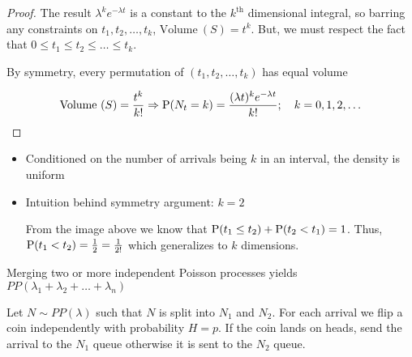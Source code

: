 \begin{theorem}
\begin{proof}
    The result $\lambda^k e^{-\lambda t}$ is a constant to the
    $k^{\text{th}}$ dimensional integral, so barring any constraints on
    $t_1,t_2,\ldots,t_k$, $\textrm{Volume}\ (S) = t^k$. But, we must
    respect the fact that $0 \le t_1 \le t_2 \le \ldots \le t_k$.

    By symmetry, every permutation of $(t_1,t_2,\ldots,t_k)$ has
    equal volume

    \begin{displaymath}
      \textrm{Volume}\ (S) = \frac{t^k}{k!} \Rightarrow \operatorname{\mathrm{P}}(N_t = k)
      = \frac{(\lambda t)^k e^{-\lambda t}}{k!}; \quad k=0,1,2,\ldots
    \end{displaymath}

  \end{proof}

  \begin{itemize}
    \item Conditioned on the number of arrivals being $k$ in an
      interval, the density is uniform
    \item Intuition behind symmetry argument: $k=2$
      \begin{center}
      \end{center}
      From the image above we know that
      $\operatorname{\mathrm{P}}(t_1 \le t_2) + \operatorname{\mathrm{P}}(t_2 < t_1) = 1$. Thus,
      $\operatorname{\mathrm{P}}(t_1 < t_2) = \frac{1}{2} = \frac{1}{2!}$ which generalizes
      to $k$ dimensions.
  \end{itemize}

\end{theorem}

\begin{definition}
  Merging two or more independent Poisson processes yields
  $PP(\lambda_1 + \lambda_2 + \ldots + \lambda_n)$
\end{definition}

\begin{definition}
  Let $N \sim PP(\lambda)$ such that $N$ is split into $N_1$ and $N_2$.
  For each arrival we flip a coin independently with probability
  $H = p$. If the coin lands on heads, send the arrival to the $N_1$
  queue otherwise it is sent to the $N_2$ queue.
\end{definition}
